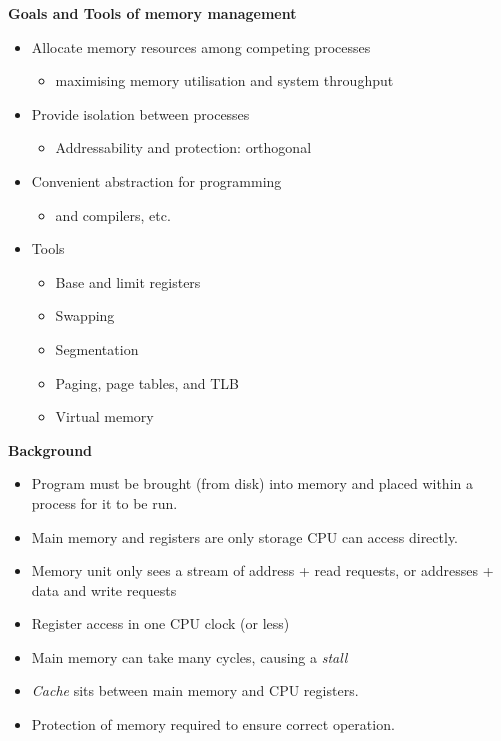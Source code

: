 \documentclass[11pt,a4paper]{article}
\begin{document}
\textbf{Goals and Tools of memory management}
\begin{itemize}
    \item Allocate memory resources among competing processes
        \begin{itemize}
            \item maximising memory utilisation and system throughput
        \end{itemize}
    \item Provide isolation between processes
        \begin{itemize}
            \item Addressability and protection: orthogonal
        \end{itemize}
    \item Convenient abstraction for programming
        \begin{itemize}
            \item and compilers, etc.
        \end{itemize}
    \item Tools
        \begin{itemize}
            \item Base and limit registers
            \item Swapping
            \item Segmentation
            \item Paging, page tables, and TLB
            \item Virtual memory
        \end{itemize}
\end{itemize}

\textbf{Background}
\begin{itemize}
    \item Program must be brought (from disk) into memory and placed within a process for it
        to be run.
    \item Main memory and registers are only storage CPU can access directly.
    \item Memory unit only sees a stream of address + read requests, or addresses + data
        and write requests
    \item Register access in one CPU clock (or less)
    \item Main memory can take many cycles, causing a \emph{stall}
    \item \emph{Cache} sits between main memory and CPU registers.
    \item Protection of memory required to ensure correct operation.
\end{itemize}
\end{document}
